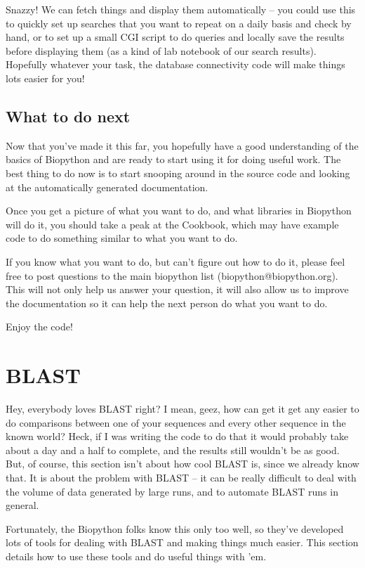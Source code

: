 \documentclass{report}
\begin{document}
Snazzy! We can fetch things and display them automatically -- you could use this to quickly set up searches that you want to repeat on a daily basis and check by hand, or to set up a small CGI script to do queries and locally save the results before displaying them (as a kind of lab notebook of our search results). Hopefully whatever your task, the database connectivity code will make things lots easier for you!

\section{What to do next}

Now that you've made it this far, you hopefully have a good understanding of the basics of Biopython and are ready to start using it for doing useful work. The best thing to do now is to start snooping around in the source code and looking at the automatically generated documentation. 


Once you get a picture of what you want to do, and what libraries in Biopython will do it, you should take a peak at the Cookbook, which may have example code to do something similar to what you want to do. 


If you know what you want to do, but can't figure out how to do it, please feel free to post questions to the main biopython list (biopython@biopython.org). This will not only help us answer your question, it will also allow us to improve the documentation so it can help the next person do what you want to do.


Enjoy the code!

\chapter{BLAST}
\label{sec:blast}

Hey, everybody loves BLAST right? I mean, geez, how can get it get any easier to do comparisons between one of your sequences and every other sequence in the known world? Heck, if I was writing the code to do that it would probably take about a day and a half to complete, and the results still wouldn't be as good. But, of course, this section isn't about how cool BLAST is, since we already know that. It is about the problem with BLAST -- it can be really difficult to deal with the volume of data generated by large runs, and to automate BLAST runs in general.


Fortunately, the Biopython folks know this only too well, so they've developed lots of tools for dealing with BLAST and making things much easier. This section details how to use these tools and do useful things with 'em. 
\end{document}
